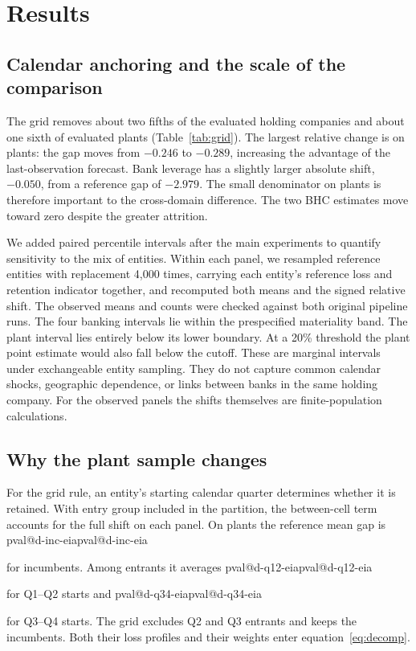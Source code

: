 \documentclass[linenumber]{jdsart}
\makeatletter
\newcommand{\val}[1]{\ifcsname pval@#1\endcsname\csname pval@#1\endcsname\else\PackageError{paper}{Missing value #1}{}\fi}
\newcommand{\datatable}[1]{{\small\setlength{\tabcolsep}{4pt}\resizebox{\ifdim\width>\linewidth\linewidth\else\width\fi}{!}{}}}
\makeatother
\begin{document}
\section{Results}
\subsection{Calendar anchoring and the scale of the comparison}
\begin{table}[t]
\caption{Effect of the three-month grid on the last-observation minus historical-mean MASE gap. Relative shifts and their paired entity-bootstrap intervals are percentages of the absolute reference gap.}\label{tab:grid}
\centering\datatable{tab_grid}
\end{table}
The grid removes about two fifths of the evaluated holding companies and about one sixth of evaluated plants (Table~\ref{tab:grid}). The largest relative change is on plants: the gap moves from \(-0.246\) to \(-0.289\), increasing the advantage of the last-observation forecast. Bank leverage has a slightly larger absolute shift, \(-0.050\), from a reference gap of \(-2.979\). The small denominator on plants is therefore important to the cross-domain difference. The two BHC estimates move toward zero despite the greater attrition.

We added paired percentile intervals after the main experiments to quantify sensitivity to the mix of entities. Within each panel, we resampled reference entities with replacement 4,000 times, carrying each entity's reference loss and retention indicator together, and recomputed both means and the signed relative shift. The observed means and counts were checked against both original pipeline runs. The four banking intervals lie within the prespecified materiality band. The plant interval lies entirely below its lower boundary. At a 20\% threshold the plant point estimate would also fall below the cutoff. These are marginal intervals under exchangeable entity sampling. They do not capture common calendar shocks, geographic dependence, or links between banks in the same holding company. For the observed panels the shifts themselves are finite-population calculations.

\subsection{Why the plant sample changes}
For the grid rule, an entity's starting calendar quarter determines whether it is retained. With entry group included in the partition, the between-cell term accounts for the full shift on each panel. On plants the reference mean gap is \val{d-inc-eia} for incumbents. Among entrants it averages \val{d-q12-eia} for Q1--Q2 starts and \val{d-q34-eia} for Q3--Q4 starts. The grid excludes Q2 and Q3 entrants and keeps the incumbents. Both their loss profiles and their weights enter equation~\eqref{eq:decomp}.
\end{document}
